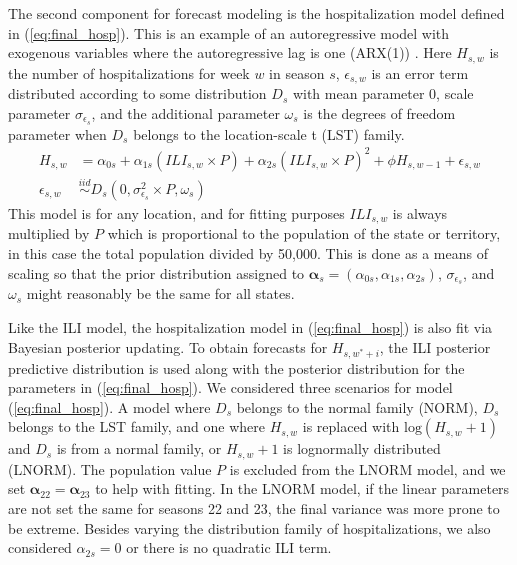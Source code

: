\documentclass[ba]{imsart}
\theoremstyle{plain}
\theoremstyle{definition}
\theoremstyle{remark}
\begin{document}
The second component for forecast modeling is the hospitalization model defined in (\ref{eq:final_hosp}). This is an example of an autoregressive model with exogenous variables where the autoregressive lag is one (ARX(1)) \cite[]{raftery2010online,ljung1987system}. Here $H_{s,w}$ is the number of hospitalizations for week $w$ in season $s$, $\epsilon_{s,w}$ is an error term distributed according to some distribution $D_s$ with mean parameter 0, scale parameter $\sigma_{\epsilon_s}$, and the additional parameter $\omega_s$ is the degrees of freedom parameter when $D_s$ belongs to the location-scale t (LST) family.  
\begin{equation}
    \begin{aligned}
    \label{eq:final_hosp}
    H_{s,w} &= \alpha_{0s} + \alpha_{1s} (ILI_{s,w} \times P) + \alpha_{2s} (ILI_{s,w} \times P)^2 + \phi H_{s,w-1} + \epsilon_{s,w}\\ 
    \epsilon_{s,w} &\overset{iid}{\sim} D_s(0, \sigma_{\epsilon_s}^2 \times P, \omega_s) %
    \end{aligned}
\end{equation}
This model is for any location, and for fitting purposes $ILI_{s,w}$ is always multiplied by $P$ which is proportional to the population of the state or territory, in this case the total population divided by 50,000. This is done as a means of scaling so that the prior distribution assigned to  $\boldsymbol{\alpha}_s = (\alpha_{0s}, \alpha_{1s}, \alpha_{2s})$, $\sigma_{\epsilon_s}$, and $\omega_s$ might reasonably be the same for all states.


Like the ILI model, the hospitalization model in (\ref{eq:final_hosp}) is also fit via Bayesian posterior updating. To obtain forecasts for $H_{s, w^* + i}$, the ILI posterior predictive distribution is used along with the posterior distribution for the parameters in (\ref{eq:final_hosp}). We considered three scenarios for model (\ref{eq:final_hosp}). A model where $D_s$ belongs to the normal family (NORM), $D_s$ belongs to the LST family, and one where $H_{s,w}$ is replaced with $\text{log}(H_{s,w} + 1)$ and $D_s$ is from a normal family, or $H_{s,w} + 1$ is lognormally distributed (LNORM). The population value $P$ is excluded from the LNORM model, and we set $\boldsymbol{\alpha}_{22} = \boldsymbol{\alpha}_{23}$ to help with fitting. In the LNORM model, if the linear parameters are not set the same for seasons 22 and 23, the final variance was more prone to be extreme. Besides varying the distribution family of hospitalizations, we also considered $\alpha_{2s} = 0$ or there is no quadratic ILI term.
\end{document}
